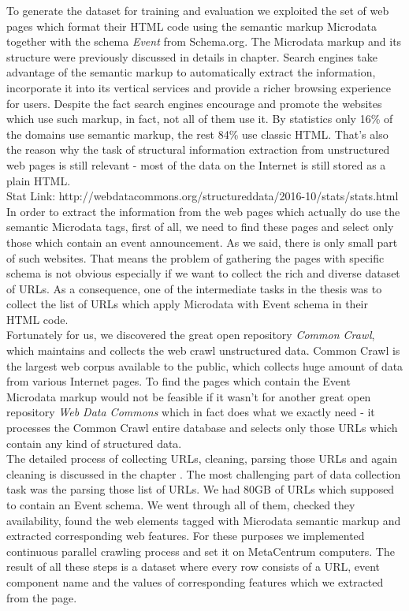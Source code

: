 To generate the dataset for training and evaluation we exploited the set of web pages which format their HTML code using the semantic markup Microdata together with the schema \textit{Event} from Schema.org. The Microdata markup and its structure were previously discussed in details in  chapter. Search engines take advantage of the semantic markup to automatically extract the information, incorporate it into its vertical services and provide a richer browsing experience for users. Despite the fact search engines encourage and promote the websites which use such markup, in fact, not all of them use it. By statistics only 16\% of the domains use semantic markup, the rest 84\% use classic HTML. That's also the reason why the task of structural information extraction from unstructured web pages is still relevant - most of the data on the Internet is still stored as a plain HTML.\\ 

Stat Link: http://webdatacommons.org/structureddata/2016-10/stats/stats.html  \\

In order to extract the information from the web pages which actually do use the semantic Microdata tags, first of all, we need to find these pages and select only those which contain an event announcement. As we said, there is only small part of such websites. That means the problem of gathering the pages with specific schema is not obvious especially if we want to collect the rich and diverse dataset of URLs. As a consequence, one of the intermediate tasks in the thesis was to collect the list of URLs which apply Microdata with Event schema in their HTML code. \\

Fortunately for us, we discovered the great open repository \textit{Common Crawl}, which maintains and collects the web crawl unstructured data. Common Crawl is the largest web corpus available to the public, which collects huge amount of data from various Internet pages. To find the pages which contain the Event Microdata markup would not be feasible if it wasn't for another great open repository \textit{Web Data Commons} which in fact does what we exactly need - it processes the Common Crawl entire database and selects only those URLs which contain any kind of structured data.\\

The detailed process of collecting URLs, cleaning, parsing those URLs and again cleaning is discussed in the chapter . The most challenging part of data collection task was the parsing those list of URLs. We had 80GB of URLs which supposed to contain an Event schema. We went through all of them, checked they availability, found the web elements tagged with Microdata semantic markup and extracted corresponding web features. For these purposes we implemented continuous parallel crawling process and set it on MetaCentrum computers. The result of all these steps is a dataset where every row consists of a URL, event component name and the values of corresponding features which we extracted from the page.\\ 

